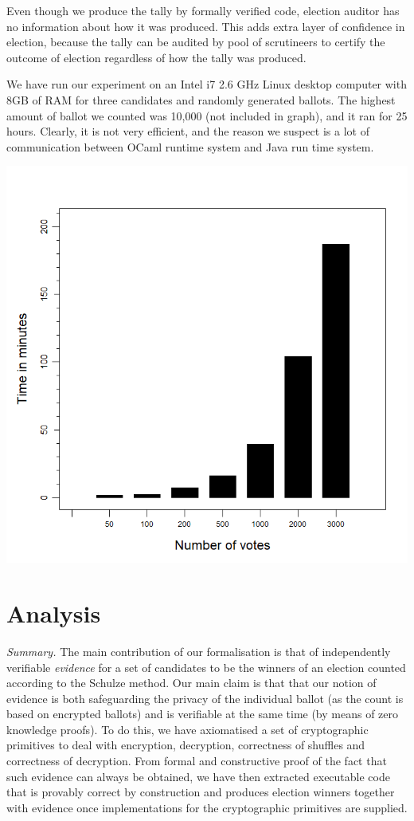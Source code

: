 \documentclass{llncs}
\begin{document}
Even though we produce the tally by formally verified code, election 
auditor has no information about how it was produced. This adds extra layer
of confidence in election, because the tally can be audited by pool
of scrutineers to certify the outcome of election regardless of how the tally 
was produced.

We have run our experiment on an  Intel  i7  2.6  GHz  Linux  desktop  computer
with  8GB  of  RAM for three candidates and randomly generated ballots. The 
highest amount of ballot we counted was 10,000 (not included in graph), and 
it ran for 25 hours. Clearly, it is not very efficient, and the reason we 
suspect is a lot of communication between OCaml runtime system 
and Java run time system.
\begin{center}
\includegraphics[scale=0.50]{PlotVer3.png}

\end{center}



\section{Analysis}

\noindent\emph{Summary.} The main contribution of our formalisation is that of independently
verifiable \emph{evidence} for a set of candidates to be the winners
of an election counted according to the Schulze method. Our main
claim is that that our notion of evidence is both safeguarding the
privacy of the individual ballot (as the count is based on encrypted
ballots) and is verifiable at the same time (by means of zero
knowledge proofs). To do this, we have axiomatised a set of
cryptographic primitives to deal with encryption, decryption,
correctness of shuffles and correctness of decryption. From formal
and constructive proof of the fact that such evidence can always be
obtained, we have then extracted executable code that is provably
correct by construction and produces election winners together with
evidence once implementations for the cryptographic primitives are
supplied.
\end{document}
